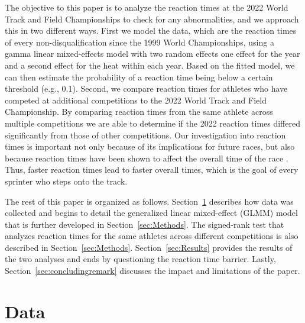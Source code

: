 \documentclass[12pt, letterpaper, titlepage]{article}
\begin{document}
The objective to this paper is to analyze the reaction times at the 2022 World 
Track and Field Championships to check for any abnormalities, and we approach
this in two different ways.  First we model the data, which are
the reaction times of every non-disqualification since the 1999 World 
Championships, using a gamma linear mixed-effects model with two random effects 
one effect for the year and a second effect for the
heat within each year.
Based on the fitted model, we can then estimate the probability of a reaction 
time being below a certain threshold (e.g., 0.1). 
Second, we compare reaction times for athletes who have competed
at additional competitions to the 2022 World Track and Field Championship.  By
comparing reaction times from the same athlete across multiple competitions we 
are able to determine if the 2022 reaction times differed significantly from 
those of other competitions.
Our investigation into reaction times is important not only because of its
implications for future races, but also because reaction times have
been shown to affect the overall time of the race \citep{delalija2008reaction}.
Thus, faster reaction times lead to faster overall times, which is the goal of
every sprinter who steps onto the track.


The rest of this paper is organized as follows. Section~\ref{sec:Data} describes 
how data was collected and begins to detail the generalized linear mixed-effect 
(GLMM) model that is further developed in Section~\ref{sec:Methods}. The 
signed-rank test that analyzes reaction times for the same athletes across
different competitions is
also described in Section~\ref{sec:Methods}.  Section~\ref{sec:Results}
 provides the results of the two analyses and ends 
by questioning the reaction time barrier.  Lastly, Section~\ref{sec:concludingremark}
discusses the impact and limitations of the paper.


\section{Data} \label{sec:Data}
\end{document}
